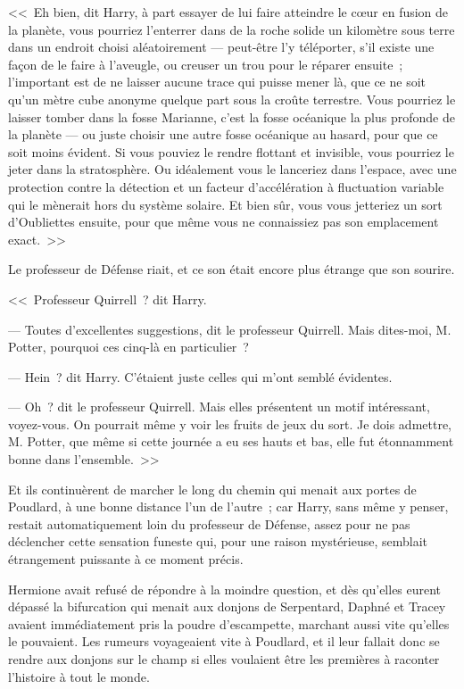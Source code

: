 <<~Eh bien, dit Harry, à part essayer de lui faire atteindre le cœur en fusion de la planète, vous pourriez l'enterrer dans de la roche solide un kilomètre sous terre dans un endroit choisi aléatoirement — peut-être l'y téléporter, s'il existe une façon de le faire à l'aveugle, ou creuser un trou pour le réparer ensuite~; l'important est de ne laisser aucune trace qui puisse mener là, que ce ne soit qu'un mètre cube anonyme quelque part sous la croûte terrestre. Vous pourriez le laisser tomber dans la fosse Marianne, c'est la fosse océanique la plus profonde de la planète — ou juste choisir une autre fosse océanique au hasard, pour que ce soit moins évident. Si vous pouviez le rendre flottant et invisible, vous pourriez le jeter dans la stratosphère. Ou idéalement vous le lanceriez dans l'espace, avec une protection contre la détection et un facteur d'accélération à fluctuation variable qui le mènerait hors du système solaire. Et bien sûr, vous vous jetteriez un sort d'Oubliettes ensuite, pour que même vous ne connaissiez pas son emplacement exact.~>>

Le professeur de Défense riait, et ce son était encore plus étrange que son sourire.

<<~Professeur Quirrell~? dit Harry.

--- Toutes d'excellentes suggestions, dit le professeur Quirrell. Mais dites-moi, M. Potter, pourquoi ces cinq-là en particulier~?

--- Hein~? dit Harry. C'étaient juste celles qui m'ont semblé évidentes.

--- Oh~? dit le professeur Quirrell. Mais elles présentent un motif intéressant, voyez-vous. On pourrait même y voir les fruits de jeux du sort. Je dois admettre, M. Potter, que même si cette journée a eu ses hauts et bas, elle fut étonnamment bonne dans l'ensemble.~>>

Et ils continuèrent de marcher le long du chemin qui menait aux portes de Poudlard, à une bonne distance l'un de l'autre~; car Harry, sans même y penser, restait automatiquement loin du professeur de Défense, assez pour ne pas déclencher cette sensation funeste qui, pour une raison mystérieuse, semblait étrangement puissante à ce moment précis.


Hermione avait refusé de répondre à la moindre question, et dès qu'elles eurent dépassé la bifurcation qui menait aux donjons de Serpentard, Daphné et Tracey avaient immédiatement pris la poudre d'escampette, marchant aussi vite qu'elles le pouvaient. Les rumeurs voyageaient vite à Poudlard, et il leur fallait donc se rendre aux donjons sur le champ si elles voulaient être les premières à raconter l'histoire à tout le monde.


